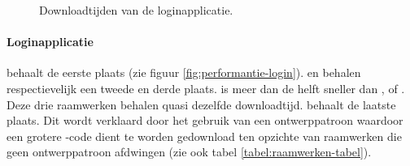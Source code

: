 \begin{figure}
  \centering
  \quad
  \caption{Downloadtijden van de loginapplicatie.}
  \label{fig:performantie-login-boxplot}
\end{figure}

\paragraph{Loginapplicatie}
\lungo{} behaalt de eerste plaats (zie figuur \ref{fig:performantie-login}).
\jqm{} en \kendo{} behalen respectievelijk een tweede en derde plaats.
\lungo{} is meer dan de helft sneller dan \jqm{}, \kendo{} of \st{}.
Deze drie raamwerken behalen quasi dezelfde downloadtijd.
\st{} behaalt de laatste plaats.
Dit wordt verklaard door het gebruik van een ontwerppatroon waardoor een grotere \js{}-code dient te worden gedownload ten opzichte van raamwerken die geen ontwerppatroon afdwingen (zie ook tabel \ref{tabel:raamwerken-tabel}).

